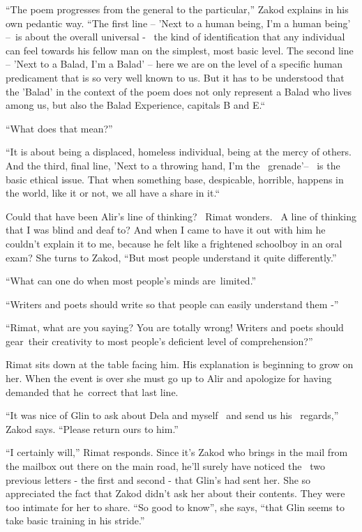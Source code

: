 \documentclass[twoside,11pt]{book}
\begin{document}
``The poem progresses from the general to the particular,'' Zakod explains in his own pedantic
way. ``The first line -- 'Next to a human being, I'm a human being' --~is about the overall universal -
\ the kind of identification that any individual can feel towards his fellow man on the simplest, most basic level. The
second line -- 'Next to a Balad, I'm a Balad' -- here we are on the level of a specific human predicament that is so
very well known to us. But it has to be understood that the 'Balad' in the context of the poem does not only represent
a Balad who lives among us, but also the Balad Experience, capitals B and E.``{ }

{}``What does that mean?''

``It is about being a displaced, homeless individual, being at the mercy of others. And the third, final
line, 'Next to a throwing hand, I'm the~ grenade'--~ is the basic ethical issue. That when something base, despicable,
horrible, happens in the world, like it or not, we all have a share in
it.``{ }

Could that have been Alir's line of thinking? \ Rimat wonders. \ A line of thinking that I was blind and deaf to? And
when I came to have it out with him he couldn't explain it to me, because he felt like a frightened schoolboy in an
oral exam? She turns to{ }Zakod, ``But most people understand it
quite differently.''

``What can one do when most people's minds are~limited.''

``Writers and poets should write so that people can easily understand them -''

``Rimat, what are you saying? You are totally wrong! Writers and poets should gear~their creativity to most
people's deficient level of comprehension?''

Rimat sits down at the table facing him. His explanation is beginning to grow on her. When the event is over she must go
up to Alir and apologize for having demanded that he~correct{ }that last line.

``It was nice of Glin to ask about Dela and{ }myself \ and send us his~
regards,'' Zakod says. ``Please return ours to him.''

``I certainly will,'' Rimat responds. Since it's Zakod who brings in the mail from the mailbox
out there on the main road, he'll surely have noticed the \ two previous letters - the first and second - that Glin's
had sent her. She so appreciated the fact that Zakod didn't ask her about their contents. They were too intimate for
her to share. ``So good to know'', she says, ``that Glin seems to take basic training in his
stride.''
\end{document}
